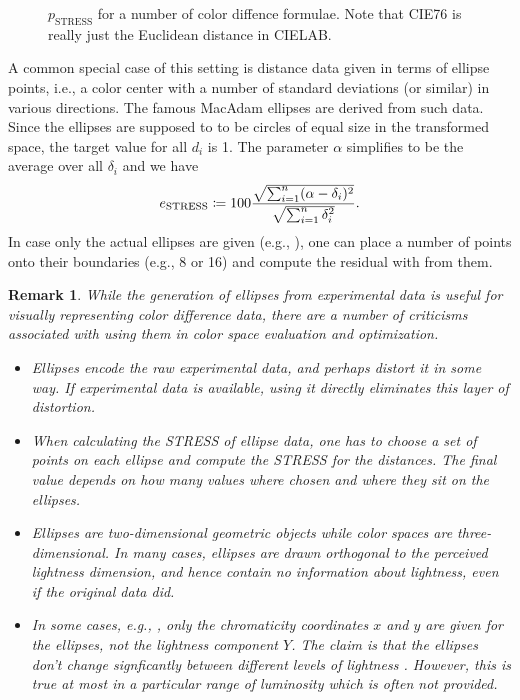 \documentclass{scrartcl}
\newtheorem*{remark}{Remark}
\theoremstyle{named}
\begin{document}
\begin{figure}
\centering
  
  \caption{$p_\text{STRESS}$ for a number of color diffence formulae.
  Note that CIE76 is really just the Euclidean distance in CIELAB.}
\end{figure}

A common special case of this setting is distance data given in terms of ellipse points,
i.e., a color center with a number of standard deviations (or similar) in various
directions. The famous MacAdam ellipses \cite{macadam1942} are derived from such data.
Since the ellipses are supposed to to be circles of equal size in the transformed space,
the target value for all $d_i$ is 1. The parameter $\alpha$ simplifies to be the average
over all $\delta_i$ and we have
\begin{equation}\label{eq:e}
  e_{\text{STRESS}}
  \coloneqq
  100
  \frac{%
    \sqrt{\sum_{i=1}^n (\alpha - \delta_{i})^2}
  }{
    \sqrt{\sum_{i=1}^n \delta_i^2}
  }.
\end{equation}
In case only the actual ellipses are given (e.g., \cite{luorigg}), one can place a
number of points onto their boundaries (e.g., 8 or 16) and compute the residual with
from them.

\begin{remark}
  While the generation of ellipses from experimental data is useful for visually
  representing color difference data, there are a number of criticisms associated with
  using them in color space evaluation and optimization.
  \begin{itemize}
    \item Ellipses encode the raw experimental data, and perhaps distort it in some way.
      If experimental data is available, using it directly eliminates this layer of
      distortion.
    \item When calculating the STRESS of ellipse data, one has to choose a set of points
      on each ellipse and compute the STRESS for the distances. The final value depends
      on how many values where chosen and where they sit on the ellipses.
    \item Ellipses are two-dimensional geometric objects while color spaces are
      three-dimensional. In many cases, ellipses are drawn orthogonal to the perceived
      lightness dimension, and hence contain no information about lightness, even if the
      original data did.
    \item In some cases, e.g., \cite{macadam1942}, only the chromaticity coordinates $x$
      and $y$ are given for the ellipses, not the lightness component $Y$. The claim is
      that the ellipses don't change signficantly between different levels of lightness
      \cite{brown}. However, this is true at most in a particular range of luminosity
      which is often not provided.
    \end{itemize}
\end{remark}
\end{document}
